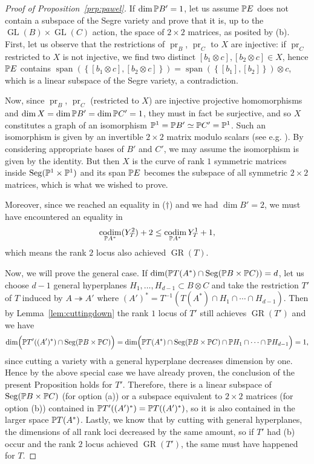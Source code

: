 \documentclass[a4paper,10pt]{article}
\def\set#1{\left\{#1\right\}}
\let\surjto\twoheadrightarrow
\DeclareMathOperator{\codim}{codim}
\DeclareMathOperator{\Seg}{Seg}
\DeclareMathOperator{\GR}{GR}
\DeclareMathOperator{\GL}{GL}
\DeclareMathOperator{\pr}{pr}
\DeclareMathOperator{\spn}{span}
\theoremstyle{definition}
\theoremstyle{remark}
\begin{document}
\begin{proof}[Proof of Proposition~\ref{prp:pawel}]
    If $\dim\pe B' = 1$, let us assume $\pe E$ does not contain a subspace of the Segre variety and prove that it is, up to the $\GL(B)\times\GL(C)$ action, the space of $2\times2$ matrices, as posited by (b). First, let us observe that the restrictions of $\pr_B$, $\pr_C$ to $X$ are injective: if $\pr_C$ restricted to $X$ is not injective, we find two distinct $[b_1\otimes c], [b_2\otimes c]\in X$, hence $\pe E$ contains $\spn(\set{[b_1\otimes c], [b_2\otimes c]}) = \spn(\set{[b_1], [b_2]})\otimes c$, which is a linear subspace of the Segre variety, a contradiction.

    Now, since $\pr_B$, $\pr_C$ (restricted to $X$) are injective projective homomorphisms and $\dim X = \dim \pe B' = \dim\pe C' = 1$, they must in fact be surjective, and so $X$ constitutes a graph of an isomorphism $\pe^1 = \pe B' \simeq \pe C' = \pe^1$. Such an isomorphism is given by an invertible $2\times 2$ matrix modulo scalars (see e.g. \cite[15.5.A]{rising-sea}). By considering appropriate bases of $B'$ and $C'$, we may assume the isomorphism is given by the identity. But then $X$ is the curve of rank $1$ symmetric matrices inside $\Seg(\pe^1\times\pe^1)$ and its span $\pe E$ becomes the subspace of all symmetric $2\times 2$ matrices, which is what we wished to prove.

    Moreover, since we reached an equality in ($\dag$) and we had $\dim B'=2$, we must have encountered an equality in
    \[
        \codim_{\pe A^*}(Y^2_T)+2 \leq \codim_{\pe A^*}Y^1_T + 1,
    \]
    which means the rank $2$ locus also achieved $\GR(T)$.


    \bigskip
    Now, we will prove the general case. If $\dim(\pe T(A^*)\cap \Seg(\pe B\times\pe C))=d$, let us choose $d-1$ general hyperplanes $H_1,\dots,H_{d-1}\subset B\otimes C$ and take the restriction $T'$ of $T$ induced by $A\surjto A'$ where $(A')^* = T^{-1}(T(A^*)\cap H_1\cap\cdots\cap H_{d-1})$. Then by Lemma~\ref{lem:cuttingdown} the rank $1$ locus of $T'$ still achieves $\GR(T')$ and we have
    \[
        \dim\Bigl(\pe T'((A')^*)\cap \Seg(\pe B\times\pe C)\Bigr) = \dim\Bigl(\pe T(A^*)\cap \Seg(\pe B\times\pe C)\cap \pe H_1\cap\cdots\cap \pe H_{d-1}\Bigr) = 1,
    \]
    since cutting a variety with a general hyperplane decreases dimension by one.
    Hence by the above special case we have already proven, the conclusion of the present Proposition holds for $T'$. Therefore, there is a linear subspace of $\Seg(\pe B\times \pe C)$ (for option (a)) or a subspace equivalent to $2\times 2$ matrices (for option (b)) contained in $\pe T'((A')^*) = \pe T((A')^*)$, so it is also contained in the larger space $\pe T(A^*)$. Lastly, we know that by cutting with general hyperplanes, the dimensions of all rank loci decreased by the same amount, so if $T'$ had (b) occur and the rank $2$ locus achieved $\GR(T')$, the same must have happened for $T$.
\end{proof}
\end{document}
